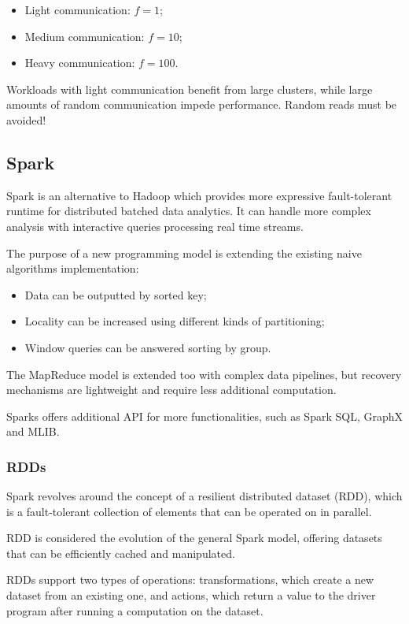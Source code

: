 \begin{itemize}
	\item Light communication: $f = 1$;
	\item Medium communication: $f = 10$;
	\item Heavy communication: $f = 100$.
\end{itemize}

Workloads with light communication benefit from large clusters, while large amounts of random communication impede performance. Random reads must be avoided!

\subsection{Spark}
Spark is an alternative to Hadoop which provides more expressive fault-tolerant runtime for distributed batched data analytics. It can handle more complex analysis with interactive queries processing real time streams.

The purpose of a new programming model is extending the existing naive algorithms implementation:
\begin{itemize}
	\item Data can be outputted by sorted key;
	\item Locality can be increased using different kinds of partitioning;
	\item Window queries can be answered sorting by group.
\end{itemize}

The MapReduce model is extended too with complex data pipelines, but recovery mechanisms are lightweight and require less additional computation.

Sparks offers additional API for more functionalities, such as Spark SQL, GraphX and MLIB.

\subsubsection{RDDs}
Spark revolves around the concept of a resilient distributed dataset (RDD), which is a fault-tolerant collection of elements that can be operated on in parallel.

RDD is considered the evolution of the general Spark model, offering datasets that can be efficiently cached and manipulated. 

RDDs support two types of operations: transformations, which create a new dataset from an existing one, and actions, which return a value to the driver program after running a computation on the dataset.

